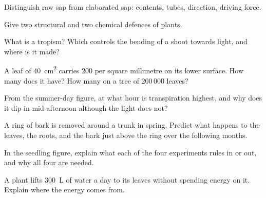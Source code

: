 \begin{exercise}[$\star$]\label{exo:g12:plant-rooted-life:3}
Distinguish raw sap from elaborated sap: contents, tubes, direction,
driving force.
\end{exercise}

\begin{exercise}[$\star$]\label{exo:g12:plant-rooted-life:4}
Give two structural and two chemical defences of plants.
\end{exercise}

\begin{exercise}[$\star$]\label{exo:g12:plant-rooted-life:5}
What is a tropism? Which  controls the bending of a shoot
towards light, and where is it made?
\end{exercise}

\begin{exercise}[$\star\star$]\label{exo:g12:plant-rooted-life:6}
A leaf of \qty{40}{cm^2} carries 200  per square millimetre on
its lower surface. How many  does it have? How many on a tree
of 200\,000 leaves?
\end{exercise}

\begin{exercise}[$\star\star$]\label{exo:g12:plant-rooted-life:7}
From the summer-day figure, at what hour is transpiration highest,
and why does it dip in mid-afternoon although the light does not?
\end{exercise}

\begin{exercise}[$\star\star$]\label{exo:g12:plant-rooted-life:8}
A ring of bark is removed around a trunk in spring. Predict what
happens to the leaves, the roots, and the bark just above the ring
over the following months.
\end{exercise}

\begin{exercise}[$\star\star$]\label{exo:g12:plant-rooted-life:9}
In the seedling figure, explain what each of the four experiments
rules in or out, and why all four are needed.
\end{exercise}

\begin{exercise}[$\star\star$]\label{exo:g12:plant-rooted-life:10}
A plant lifts \qty{300}{L} of water a day to its leaves without
spending energy on it. Explain where the energy comes from.
\end{exercise}

